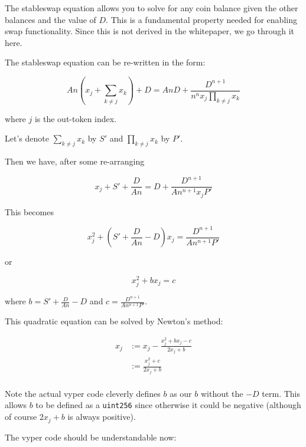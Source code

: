 \documentclass[
]{article}
\newcommand{\passthrough}[1]{#1}
\begin{document}
The stableswap equation allows you to solve for any coin balance given
the other balances and the value of \(D\). This is a fundamental
property needed for enabling swap functionality. Since this is not
derived in the whitepaper, we go through it here.

The stableswap equation can be re-written in the form:

\[ An\left(x_j + \sum_{k\neq j} x_k\right) + D = AnD + \frac{D^{n+1}}{n^n x_j \prod_{k\neq j} x_k} \]

where \(j\) is the out-token index.

Let's denote \(\sum_{k\neq j} x_k\) by \(S'\) and
\(\prod_{k\neq j} x_k\) by \(P'\).

Then we have, after some re-arranging

\[ x_j + S' + \frac{D}{An} = D + \frac{D^{n+1}}{An^{n+1} x_j P'} \]

This becomes

\[ x_j^2 + \left(S' + \frac{D}{An} - D\right) x_j = \frac{D^{n+1}}{An^{n+1}P'}\]

or

\[ x_j^2 + bx_j = c\]

where \(b = S' + \frac{D}{An} - D\) and
\(c = \frac{D^{n+1}}{An^{n+1}P'}\).

This quadratic equation can be solved by Newton's method:

\[ \begin{aligned}
x_j &:= x_j - \frac{x_j^2 + bx_j - c}{2x_j + b}\\
&:= \frac{x_j^2 + c}{2x_j + b} \\
\end{aligned} \]

Note the actual vyper code cleverly defines \(b\) as our \(b\) without
the \(-D\) term. This allows \(b\) to be defined as a
\passthrough{\lstinline!uint256!} since otherwise it could be negative
(although of course \(2x_j + b\) is always positive).

The vyper code should be understandable now:
\end{document}
